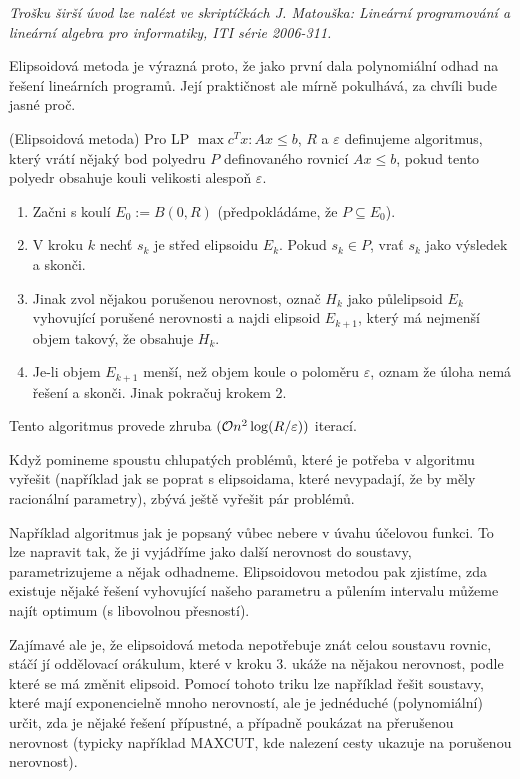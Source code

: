 {\it Trošku širší úvod lze nalézt ve skriptíčkách J. Matouška: Lineární
programování a lineární algebra pro informatiky, ITI série 2006-311.}

Elipsoidová metoda je výrazná proto, že jako první dala polynomiální odhad na
řešení lineárních programů. Její praktičnost ale mírně pokulhává, za chvíli bude
jasné proč.

\alg (Elipsoidová metoda) Pro LP $\max c^Tx: Ax \leq b$, $R$ a $\varepsilon$
definujeme algoritmus, který vrátí nějaký bod polyedru $P$ definovaného rovnicí $Ax \leq b$,
pokud tento polyedr obsahuje kouli velikosti alespoň $\varepsilon$.
\begin{enumerate}
	\item Začni s koulí $E_0 := B(0, R)$ (předpokládáme, že $P \subseteq E_0$).
	\item V kroku $k$ nechť $s_k$ je střed elipsoidu $E_k$. Pokud $s_k \in P$,
	vrať $s_k$ jako výsledek a skonči.
	\item Jinak zvol nějakou porušenou nerovnost, označ $H_k$ jako půlelipsoid
	$E_k$ vyhovující porušené nerovnosti a najdi elipsoid $E_{k+1}$, který má
	nejmenší objem takový, že obsahuje $H_k$.
	\item Je-li objem $E_{k+1}$ menší, než objem koule o poloměru $\varepsilon$,
	oznam že úloha nemá řešení a skonči. Jinak pokračuj krokem 2.
\end{enumerate}
Tento algoritmus provede zhruba $(\mathcal{O} n^2\log (R/\varepsilon))$ iterací.

Když pomineme spoustu chlupatých problémů, které je potřeba v algoritmu vyřešit
(například jak se poprat s elipsoidama, které nevypadají, že by měly racionální
parametry), zbývá ještě vyřešit pár problémů.

Například algoritmus jak je popsaný vůbec nebere v úvahu účelovou funkci. To lze
napravit tak, že ji vyjádříme jako další nerovnost do soustavy, parametrizujeme
a nějak odhadneme. Elipsoidovou metodou pak zjistíme, zda existuje nějaké řešení
vyhovující našeho parametru a půlením intervalu můžeme najít optimum (s
libovolnou přesností).

Zajímavé ale je, že elipsoidová metoda nepotřebuje znát celou soustavu rovnic,
stáčí jí oddělovací orákulum, které v kroku 3. ukáže na nějakou nerovnost, podle
které se má změnit elipsoid. Pomocí tohoto triku lze například řešit soustavy,
které mají exponencielně mnoho nerovností, ale je jednéduché (polynomiální)
určit, zda je nějaké řešení přípustné, a případně poukázat na přerušenou
nerovnost (typicky například MAXCUT, kde nalezení cesty ukazuje na porušenou
nerovnost).
